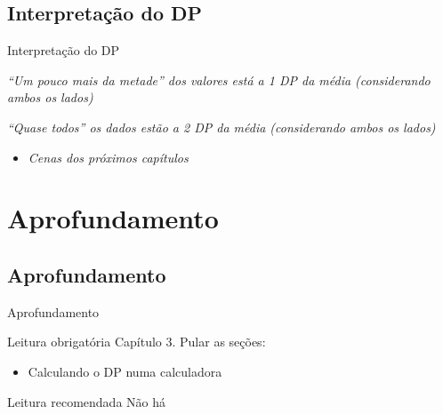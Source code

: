 \documentclass{beamer}
\begin{document}
\subsection{Interpretação do DP}

\begin{frame}{\scriptsize Interpretação do DP}
  \begin{block}{}
    \footnotesize
    {\em ``Um pouco mais da metade'' dos valores está a 1 DP da média (considerando ambos os lados)}
  \end{block}
  \begin{block}{}
    \footnotesize
    {\em ``Quase todos'' os dados estão a 2 DP da média (considerando ambos os lados)}
  \end{block}
  \begin{itemize}
    \footnotesize
  \item {\em Cenas dos próximos capítulos}
  \end{itemize}
\end{frame}

\section{Aprofundamento}

\subsection{Aprofundamento}

\begin{frame}{\scriptsize Aprofundamento}
  \begin{block}{Leitura obrigatória}
    \footnotesize
    Capítulo 3. Pular as seções:
    \begin{itemize}
      \footnotesize
    \item Calculando o DP numa calculadora
    \end{itemize}
  \end{block}
  \begin{block}{Leitura recomendada}
    \scriptsize
    Não há
  \end{block}
\end{frame}
\end{document}
